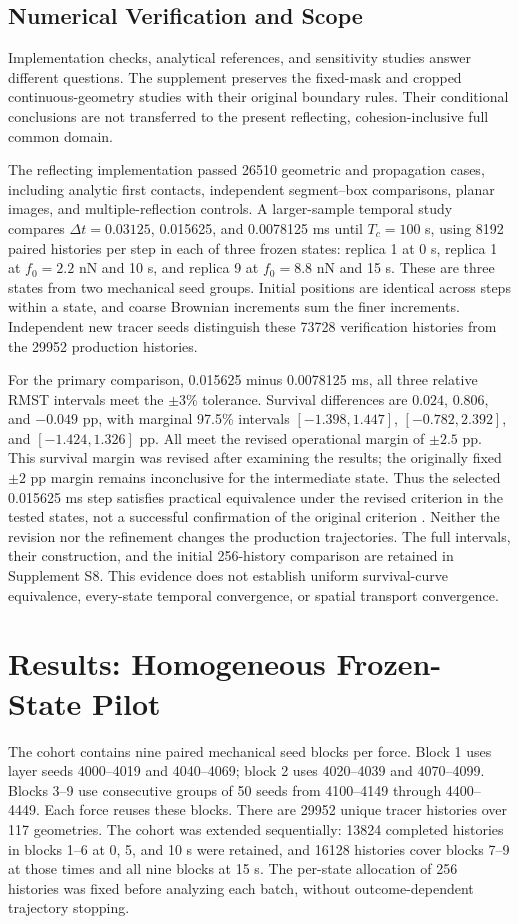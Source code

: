 \subsection{Numerical Verification and Scope}
\label{sec:verification}
Implementation checks, analytical references, and sensitivity studies answer different questions. The supplement preserves the fixed-mask and cropped continuous-geometry studies with their original boundary rules. Their conditional conclusions are not transferred to the present reflecting, cohesion-inclusive full common domain.

The reflecting implementation passed 26510 geometric and propagation cases, including analytic first contacts, independent segment--box comparisons, planar images, and multiple-reflection controls. A larger-sample temporal study compares $\Delta t=0.03125$, 0.015625, and 0.0078125 ms until $T_c=100$ s, using 8192 paired histories per step in each of three frozen states: replica 1 at 0 s, replica 1 at $f_0=2.2$ nN and 10 s, and replica 9 at $f_0=8.8$ nN and 15 s. These are three states from two mechanical seed groups. Initial positions are identical across steps within a state, and coarse Brownian increments sum the finer increments. Independent new tracer seeds distinguish these 73728 verification histories from the 29952 production histories.

For the primary comparison, 0.015625 minus 0.0078125 ms, all three relative RMST intervals meet the $\pm3\%$ tolerance. Survival differences are $0.024$, $0.806$, and $-0.049$ pp, with marginal 97.5\% intervals $[-1.398,1.447]$, $[-0.782,2.392]$, and $[-1.424,1.326]$ pp. All meet the revised operational margin of $\pm2.5$ pp. This survival margin was revised after examining the results; the originally fixed $\pm2$ pp margin remains inconclusive for the intermediate state. Thus the selected 0.015625 ms step satisfies practical equivalence under the revised criterion in the tested states, not a successful confirmation of the original criterion \cite{Lakens2017}. Neither the revision nor the refinement changes the production trajectories. The full intervals, their construction, and the initial 256-history comparison are retained in Supplement S8. This evidence does not establish uniform survival-curve equivalence, every-state temporal convergence, or spatial transport convergence.

\section{Results: Homogeneous Frozen-State Pilot}
The cohort contains nine paired mechanical seed blocks per force. Block 1 uses layer seeds 4000--4019 and 4040--4069; block 2 uses 4020--4039 and 4070--4099. Blocks 3--9 use consecutive groups of 50 seeds from 4100--4149 through 4400--4449. Each force reuses these blocks. There are 29952 unique tracer histories over 117 geometries. The cohort was extended sequentially: 13824 completed histories in blocks 1--6 at 0, 5, and 10 s were retained, and 16128 histories cover blocks 7--9 at those times and all nine blocks at 15 s. The per-state allocation of 256 histories was fixed before analyzing each batch, without outcome-dependent trajectory stopping.

